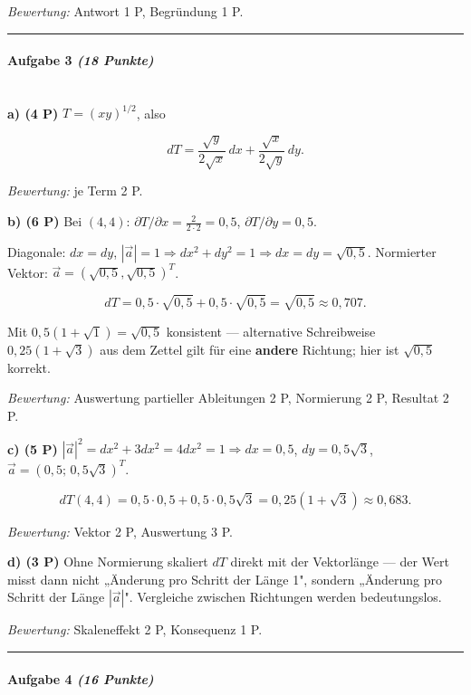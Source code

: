 \documentclass[11pt, a4paper]{article}
\begin{document}
\textit{Bewertung:} Antwort 1 P, Begründung 1 P.



\noindent\textcolor{rulegray}{\rule{\linewidth}{0.4pt}}


\paragraph{Aufgabe 3 \textit{(18 Punkte)}}\mbox{}\\[2pt]

\textbf{a) (4 P)} $T = (xy)^{1/2}$, also

\[
dT = \frac{\sqrt{y}}{2\sqrt{x}}\,dx + \frac{\sqrt{x}}{2\sqrt{y}}\,dy.
\]

\textit{Bewertung:} je Term 2 P.


\textbf{b) (6 P)} Bei $(4,4)$: $\partial T/\partial x = \tfrac{2}{2\cdot 2} = 0{,}5$, $\partial T/\partial y = 0{,}5$.

Diagonale: $dx=dy$, $|\vec{a}|=1 \Rightarrow dx^2+dy^2 = 1 \Rightarrow dx=dy=\sqrt{0{,}5}$. Normierter Vektor: $\vec{a}=(\sqrt{0{,}5},\sqrt{0{,}5})^T$.

\[
dT = 0{,}5\cdot\sqrt{0{,}5} + 0{,}5\cdot\sqrt{0{,}5} = \sqrt{0{,}5} \approx 0{,}707.
\]

Mit $0{,}5(1+\sqrt{1}) = \sqrt{0{,}5}$ konsistent — alternative Schreibweise $0{,}25(1+\sqrt{3})$ aus dem Zettel gilt für eine \textbf{andere} Richtung; hier ist $\sqrt{0{,}5}$ korrekt.

\textit{Bewertung:} Auswertung partieller Ableitungen 2 P, Normierung 2 P, Resultat 2 P.


\textbf{c) (5 P)} $|\vec{a}|^2 = dx^2 + 3dx^2 = 4dx^2 = 1 \Rightarrow dx=0{,}5$, $dy=0{,}5\sqrt{3}$, $\vec{a}=(0{,}5;\,0{,}5\sqrt{3})^T$.

\[
dT(4,4) = 0{,}5\cdot 0{,}5 + 0{,}5\cdot 0{,}5\sqrt{3} = 0{,}25(1+\sqrt{3}) \approx 0{,}683.
\]

\textit{Bewertung:} Vektor 2 P, Auswertung 3 P.


\textbf{d) (3 P)} Ohne Normierung skaliert $dT$ direkt mit der Vektorlänge — der Wert misst dann nicht „Änderung pro Schritt der Länge 1", sondern „Änderung pro Schritt der Länge $|\vec{a}|$". Vergleiche zwischen Richtungen werden bedeutungslos.

\textit{Bewertung:} Skaleneffekt 2 P, Konsequenz 1 P.



\noindent\textcolor{rulegray}{\rule{\linewidth}{0.4pt}}


\paragraph{Aufgabe 4 \textit{(16 Punkte)}}\mbox{}\\[2pt]
\end{document}
